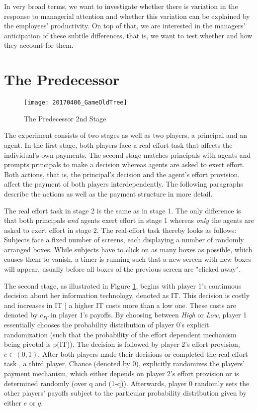 In very broad terms, we want to investigate whether there is variation in the response to managerial attention and whether this variation can be explained by the employees' productivity. On top of that, we are interested in the managers' anticipation of these subtile differences, that is, we want to test whether and how they account for them.




\section{The Predecessor}

\begin{figure}
	\texttt{[image: 20170406\_GameOldTree]}
    \caption{The Predecessor 2nd Stage}
    \label{fig:oldstage2}
\end{figure}

The experiment consists of two stages as well as two players, a principal and an agent. In the first stage, both players face a real effort task that affects the individual's own payments. The second stage matches principals with agents and prompts principals to make a decision whereas agents are asked to exert effort. Both actions, that is, the principal's decision and the agent's effort provision, affect the payment of both players interdependently. The following paragraphs describe the actions as well as the payment structure in more detail.

The real effort task in stage 2 is the same as in stage 1. The only difference is that both principals \emph{and} agents exert effort in stage 1 whereas \emph{only} the agents are asked to exert effort in stage 2. The real-effort task thereby looks as follows: Subjects face a fixed number of screens, each displaying a number of randomly arranged boxes. While subjects have to click on as many boxes as possible, which causes them to vanish, a timer is running such that a new screen with new boxes will appear, usually before all boxes of the previous screen are "clicked away".

The second stage, as illustrated in Figure \ref{fig:oldstage2}, begins with player 1's continuous decision about her information technology, denoted as IT. This decision is costly and increases in IT | a higher IT costs more than a low one. These costs are denoted by $c_{IT}$ in player 1's payoffs. By choosing between \textit{High} or \textit{Low}, player 1 essentially chooses the probability distribution of player $0$'s explicit randomization (such that the probability of the effort dependent mechanism being pivotal is p(IT)). The decision is followed by player 2's effort provision, $e \in (0,1)$. After both players made their decisions or completed the real-effort task , a third player, Chance (denoted by $0$), explicitly randomizes the players' payment mechanism, which either depends on player 2's effort provision or is determined randomly (over q and (1-q)). Afterwards, player $0$ randomly sets the other players' payoffs subject to the particular probability distribution given by either $e$ or $q$. 

